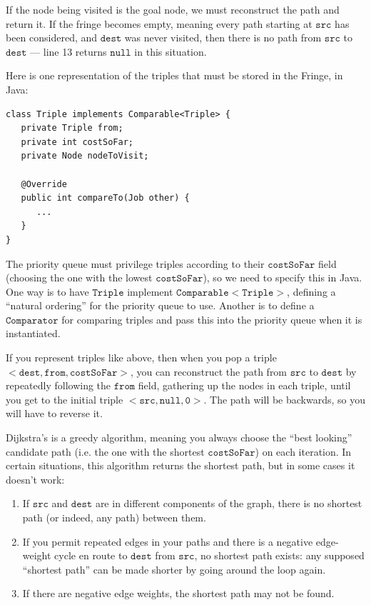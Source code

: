 \documentclass[a4paper,12pt]{article}
\newcommand{\kwa}[1]{\mathtt{#1}}
\begin{document}
If the node being visited is the goal node, we must reconstruct the path and return it. If the fringe becomes empty, meaning every path starting at $\kwa{src}$ has been considered, and $\kwa{dest}$ was never visited, then there is no path from $\kwa{src}$ to $\kwa{dest}$ --- line 13 returns $\kwa{null}$ in this situation.

Here is one representation of the triples that must be stored in the Fringe, in Java:

\begin{lstlisting}
class Triple implements Comparable<Triple> {
   private Triple from;
   private int costSoFar;
   private Node nodeToVisit;
   
   @Override
   public int compareTo(Job other) {
      ...
   }
}
\end{lstlisting}

\noindent
The priority queue must privilege triples according to their $\kwa{costSoFar}$ field (choosing the one with the lowest $\kwa{costSoFar}$), so we need to specify this in Java. One way is to have $\kwa{Triple}$ implement $\kwa{Comparable<Triple>}$, defining a ``natural ordering'' for the priority queue to use. Another is to define a $\kwa{Comparator}$ for comparing triples and pass this into the priority queue when it is instantiated.

If you represent triples like above, then when you pop a triple $\kwa{<dest, from, costSoFar>}$, you can reconstruct the path from $\kwa{src}$ to $\kwa{dest}$ by repeatedly following the $\kwa{from}$ field, gathering up the nodes in each triple, until you get to the initial triple $\kwa{<src, null, 0>}$. The path will be backwards, so you will have to reverse it.

Dijkstra's is a greedy algorithm, meaning you always choose the ``best looking'' candidate path (i.e. the one with the shortest $\kwa{costSoFar}$) on each iteration. In certain situations, this algorithm returns the shortest path, but in some cases it doesn't work:

\begin{enumerate}
	\item If $\kwa{src}$ and $\kwa{dest}$ are in different components of the graph, there is no shortest path (or indeed, any path) between them.
	\item If you permit repeated edges in your paths and there is a negative edge-weight cycle en route to $\kwa{dest}$ from $\kwa{src}$, no shortest path exists: any supposed ``shortest path'' can be made shorter by going around the loop again.
	\item If there are negative edge weights, the shortest path may not be found.
\end{enumerate}
\end{document}
